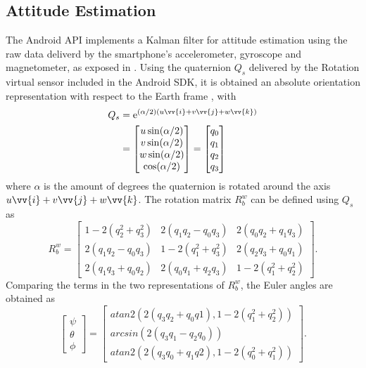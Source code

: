 \subsection{Attitude Estimation}
The Android API implements a Kalman filter for attitude estimation using the raw data deliverd by the smartphone's accelerometer, gyroscope and magnetometer, as exposed in \cite{Astudillo2017}. Using the quaternion $Q_s$ delivered by the Rotation virtual sensor included in the Android SDK, it is obtained an absolute orientation representation with respect to the Earth frame \cite{AndSensor}, with
\begin{align}\label{eqn:rotvector}
\begin{split}
Q_{s} &= \mathrm{e}^{(\alpha/2)(u\vv{i}+v\vv{j}+w\vv{k})} \\
&= \begin{bmatrix}
u\sin(\alpha / 2)\\
v\sin(\alpha / 2)\\
w\sin(\alpha / 2)\\
\cos(\alpha / 2)
\end{bmatrix} = \begin{bmatrix}
q_{0} \\
q_{1} \\
q_{2} \\
q_{3}
\end{bmatrix}
\end{split}
\end{align}
where $\alpha$ is the amount of degrees the quaternion is rotated around the axis $u\vv{i}+v\vv{j}+w\vv{k}$. The rotation matrix $R_{b}^{w}$ can be defined using $Q_s$ as
\begin{equation}
R_{b}^{w} = \begin{bmatrix}
1-2(q_{2}^{2}+q_{3}^{2}) & 2(q_{1}q_{2}-q_{0}q_{3}) & 2(q_{0}q_{2}+q_{1}q_{3}) \\
2(q_{1}q_{2}-q_{0}q_{3}) & 1-2(q_{1}^{2}+q_{3}^{2}) & 2(q_{2}q_{3}+q_{0}q_{1}) \\
2(q_{1}q_{3}+q_{0}q_{2}) & 2(q_{0}q_{1}+q_{2}q_{3}) & 1-2(q_{1}^{2}+q_{2}^{2})
\end{bmatrix}.
\end{equation}
Comparing the terms in the two representations of $R_{b}^{w}$, the Euler angles are obtained as
\begin{equation}\label{eqn:quattoeu}
\begin{bmatrix}
\psi \\
\theta \\
\phi
\end{bmatrix} =
\begin{bmatrix}
atan2(2(q_{3}q_{2} + q_{0}q{1}),1-2(q_{1}^{2} + q_{2}^{2})) \\
arcsin(2(q_{3}q_{1} - q_{2}q_{0})) \\
atan2(2(q_{3}q_{0} + q_{1}q{2}),1-2(q_{0}^{2} + q_{1}^{2})) 
\end{bmatrix}.
\end{equation}

